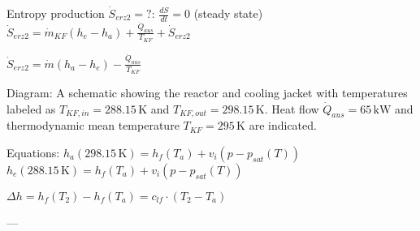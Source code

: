 Entropy production \( \dot{S}_{erz2} = ? \):  
\( \frac{dS}{dt} = 0 \) (steady state)  
\( \dot{S}_{erz2} = \dot{m}_{KF} (h_e - h_a) + \frac{\dot{Q}_{aus}}{T_{KF}} + \dot{S}_{erz2} \)  

\( \dot{S}_{erz2} = \dot{m} (h_a - h_e) - \frac{\dot{Q}_{aus}}{T_{KF}} \)  

Diagram: A schematic showing the reactor and cooling jacket with temperatures labeled as \( T_{KF,in} = 288.15 \, \text{K} \) and \( T_{KF,out} = 298.15 \, \text{K} \). Heat flow \( \dot{Q}_{aus} = 65 \, \text{kW} \) and thermodynamic mean temperature \( T_{KF} = 295 \, \text{K} \) are indicated.  

Equations:  
\( h_a(298.15 \, \text{K}) = h_f(T_a) + v_i(p - p_{sat}(T)) \)  
\( h_e(288.15 \, \text{K}) = h_f(T_a) + v_i(p - p_{sat}(T)) \)  

\( \Delta h = h_f(T_2) - h_f(T_a) = c_{lf} \cdot (T_2 - T_a) \)  

---